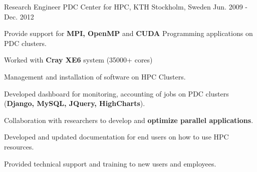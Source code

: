 \begin{cventries}
\cventry
{Research Engineer} %
{PDC Center for HPC, KTH} %
{Stockholm, Sweden} %
{Jun. 2009 - Dec. 2012} %
{ %
\begin{cvitems}
\item Provide support for \textbf {MPI, OpenMP} and \textbf{CUDA} Programming applications on PDC clusters.
\item Worked with \textbf{Cray XE6} system (35000+ cores)
\item Management and installation of software on HPC Clusters.
\item Developed dashboard for monitoring, accounting of jobs on PDC clusters (\textbf{Django, MySQL, JQuery, HighCharts}).
\item Collaboration with researchers to develop and \textbf{optimize parallel applications}.
\item Developed and updated documentation for end users on how to use HPC resources.
\item Provided technical support and training to new users and employees.
\end{cvitems}
}


\end{cventries}
